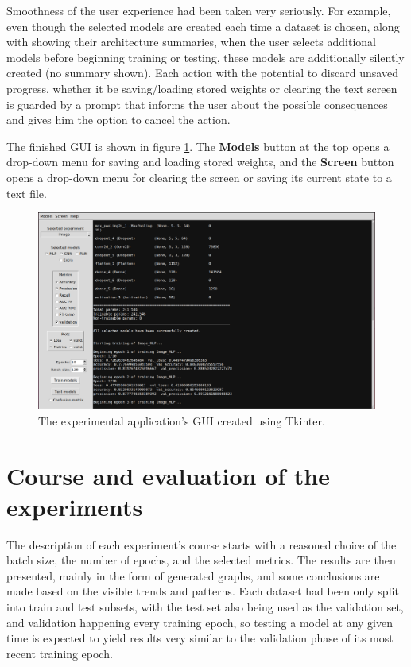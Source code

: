 Smoothness of the user experience had been taken very seriously.
For example, even though the selected models are created each time a dataset is chosen,
along with showing their architecture summaries, when the user selects additional models
before beginning training or testing, these models are additionally silently created (no summary shown).
Each action with the potential to discard unsaved progress, whether it be saving/loading stored weights
or clearing the text screen is guarded by a prompt that informs the user about the possible consequences
and gives him the option to cancel the action.

The finished GUI is shown in figure \ref{fig:gui-example}. The \textbf{Models} button at the top opens
a drop-down menu for saving and loading stored weights, and the \textbf{Screen} button opens a drop-down menu
for clearing the screen or saving its current state to a text file.

\begin{figure}[!hb]
    \centering
    \includegraphics[width=\textwidth]{obrazky-figures/GUI_example.png}
    \caption{The experimental application's GUI created using Tkinter.}
    \label{fig:gui-example}
\end{figure}








\chapter{Course and evaluation of the experiments}
\label{course-and-evaluation-of-the-experiments}
The description of each experiment's course starts with a reasoned choice of the batch size, the number of
epochs, and the selected metrics.
The results are then presented, mainly in the form of generated graphs, and some conclusions are made
based on the visible trends and patterns.
Each dataset had been only split into train and test subsets, with the test set also being used as the validation
set, and validation happening every training epoch, so testing a model at any given time is expected to yield results
very similar to the validation phase of its most recent training epoch.


